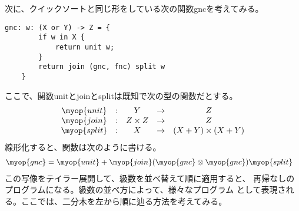 	次に、クイックソートと同じ形をしている次の関数gncを考えてみる。
	\begin{lstlisting}[caption=再帰によるgnc, label=code:再帰によるgnc]
	gnc: w: (X or Y) -> Z = {
		if w in X {
			return unit w;
		}
		return join (gnc, fnc) split w
	}
	\end{lstlisting}
	ここで、関数unitとjoinとsplitは既知で次の型の関数だとする。
	\begin{equation*}\begin{array}{ccccc} %
		\myop{unit} &:& Y &\to& Z \\
		\myop{join} &:& Z\times Z &\to& Z \\
		\myop{split} &:& X &\to& (X+Y)\times (X+Y) \\
	\end{array}\end{equation*} %
	線形化すると、関数は次のように書ける。
	\begin{equation*}\begin{split} %
		\myop{gnc} &= \myop{unit}
		+ \myop{join}(\myop{gnc}\otimes\myop{gnc})\myop{split}
	\end{split}\end{equation*} %
	この写像をテイラー展開して、級数を並べ替えて順に適用すると、
	再帰なしのプログラムになる。級数の並べ方によって、様々なプログラム
	として表現される。ここでは、二分木を左から順に辿る方法を考えてみる。
